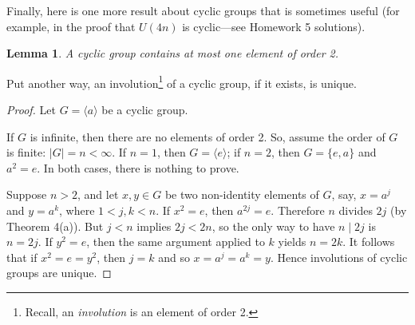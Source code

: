 \documentclass[11pt]{article}
\newcommand{\divides}{\ensuremath{\mid}}
\newcommand{\<}{\ensuremath{\langle}}
\renewcommand{\>}{\ensuremath{\rangle}}
\newcommand{\eye}{\ensuremath{e}}
\theoremstyle{plain}
\newtheorem{lem}[thm]{Lemma}
\theoremstyle{definition}
\begin{document}
\begin{center}
\end{center}

Finally, here is one more result about cyclic groups that is sometimes
useful (for example, in the proof that $U(4n)$ is cyclic---see Homework 5
solutions).
\begin{lem}
A cyclic group contains at most one element of order 2.  
\end{lem}
\noindent Put another way, an involution\footnote{Recall, an \emph{involution} is an element
  of order 2.} of a cyclic group, if it exists, is unique.
\begin{proof}
Let $G = \<a \>$ be a cyclic group.

If $G$ is infinite, then there are no elements of order 2.
So, assume the order of $G$ is finite: $|G| = n < \infty$.
If $n=1$, then $G = \<e\>$; if $n=2$, then $G = \{e, a\}$ and $a^2 = e$.
In both cases, there is nothing to prove.

Suppose $n>2$, and let $x, y \in G$ be two non-identity elements of $G$, say, 
$x = a^j$ and $y = a^k$, where $1< j, k < n$. If $x^2 = e$, then $a^{2j}=e$.  
Therefore $n$ divides $2j$ (by Theorem 4(a)).
But $j < n$ implies $2j<2n$, so the only way to have $n\divides 2j$ is
$n=2j$. If $y^2 = e$, then the same argument applied to $k$ yields $n=2k$.
It follows that if $x^2 = e = y^2$, then $j=k$ and so $x = a^{j}=a^k = y$. 
Hence involutions of cyclic groups are unique.   
\end{proof}
\end{document}
